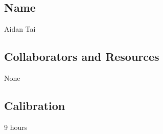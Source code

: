 \documentclass[submit]{harvardml}
\begin{document}
\newpage
\subsection*{Name}
Aidan Tai

\subsection*{Collaborators and Resources}
None

\subsection*{Calibration}
9 hours
\end{document}
